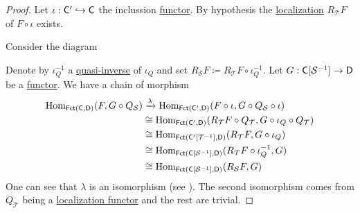 \documentclass[../../main]{subfiles}
\begin{document}
\begin{proof}
  Let \(\iota: \mathsf{C'} \hookrightarrow \mathsf{C}\) the inclussion \hyperref[def:functor]{functor}.
  By hypothesis the \hyperref[def:localization-functor]{localization} \(R_{\mathcal{T}}F\) of \(F \circ \iota\) exists.

  Consider the diagram
  \begin{center}
  \end{center}
  Denote by \(\iota_{Q}^{-1}\) a \hyperref[def:equivalent-categories]{quasi-inverse} of \(\iota_{Q}\) and set \(R_{\mathcal{S}}F \coloneq R_{\mathcal{T}}F \circ \iota_{Q}^{-1}\).
  Let \(G: \mathsf{C}[\mathcal{S}^{-1}] \to \mathsf{D}\) be a \hyperref[def:functor]{functor}.
  We have a chain of morphism
  \begin{align*}
    \operatorname{Hom}_{\mathsf{Fct}(\mathsf{C}, \mathsf{D})}(F, G \circ Q_{\mathcal{S}}) &\xrightarrow{\lambda} \operatorname{Hom}_{\mathsf{Fct}(\mathsf{C'}, \mathsf{D})}(F \circ \iota, G \circ Q_{\mathcal{S}} \circ \iota) \\
                                                          &\cong \operatorname{Hom}_{\mathsf{Fct}(\mathsf{C'}, \mathsf{D})}(R_{\mathcal{T}}F \circ Q_{\mathcal{T}}, G \circ \iota_{Q} \circ Q_{\mathcal{T}}) \\
                                                          &\cong \operatorname{Hom}_{\mathsf{Fct}(\mathsf{C'}[\mathcal{T}^{-1}], \mathsf{D})}(R_{\mathcal{T}}F, G \circ \iota_{Q}) \\
                                                          &\cong \operatorname{Hom}_{\mathsf{Fct}(\mathsf{C}[\mathcal{S}^{-1}], \mathsf{D})}(R_{\mathcal{T}}F \circ \iota_{Q}^{-1}, G) \\
                                                          &\cong \operatorname{Hom}_{\mathsf{Fct}(\mathsf{C}[\mathcal{S}^{-1}], \mathsf{D})}(R_{\mathcal{S}}F, G)
  \end{align*}
  One can see that \(\lambda\) is an isomorphism (see \cite[Proposition 7.3.2]{
    kashiwaraCategoriesSheaves2006}).
  The second isomorphism comes from \(Q_{\mathcal{T}}\) being a \hyperref[def:localization-category]{localization functor} and the rest are trivial.
\end{proof}
\end{document}
